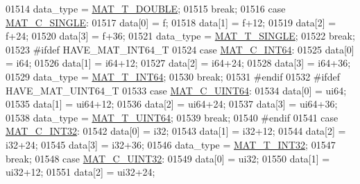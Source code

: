 \begin{DoxyCode}
{{{{{01514             data\_type = \hyperlink{group___m_a_t_ggacf7b3b879282b7ab3a51190e49bf3453a31e721ecf7e188196f83c32838288797}{MAT\_T\_DOUBLE};
01515             \textcolor{keywordflow}{break};
01516         \textcolor{keywordflow}{case} \hyperlink{group___m_a_t_ggad4d60ae7b709fc81bfd744fb4c857c40a2825631e26a961cbe0f79db50a39cea2}{MAT\_C\_SINGLE}:
01517             data[0] = f;
01518             data[1] = f+12;
01519             data[2] = f+24;
01520             data[3] = f+36;
01521             data\_type = \hyperlink{group___m_a_t_ggacf7b3b879282b7ab3a51190e49bf3453a3a3657d40e9212c923d9b9d03531b64c}{MAT\_T\_SINGLE};
01522             \textcolor{keywordflow}{break};
01523 \textcolor{preprocessor}{#ifdef HAVE\_MAT\_INT64\_T}
01524         \textcolor{keywordflow}{case} \hyperlink{group___m_a_t_ggad4d60ae7b709fc81bfd744fb4c857c40a1ea83bcde49b35477494412973f82409}{MAT\_C\_INT64}:
01525             data[0] = i64;
01526             data[1] = i64+12;
01527             data[2] = i64+24;
01528             data[3] = i64+36;
01529             data\_type = \hyperlink{group___m_a_t_ggacf7b3b879282b7ab3a51190e49bf3453a9e825b5d18b8f946eaf2b4b57e51c145}{MAT\_T\_INT64};
01530             \textcolor{keywordflow}{break};
01531 \textcolor{preprocessor}{#endif}
01532 \textcolor{preprocessor}{#ifdef HAVE\_MAT\_UINT64\_T}
01533         \textcolor{keywordflow}{case} \hyperlink{group___m_a_t_ggad4d60ae7b709fc81bfd744fb4c857c40a86470e25c3763d9a24623f04326195dd}{MAT\_C\_UINT64}:
01534             data[0] = ui64;
01535             data[1] = ui64+12;
01536             data[2] = ui64+24;
01537             data[3] = ui64+36;
01538             data\_type = \hyperlink{group___m_a_t_ggacf7b3b879282b7ab3a51190e49bf3453a45547932c46be27118abe08302d7e29f}{MAT\_T\_UINT64};
01539             \textcolor{keywordflow}{break};
01540 \textcolor{preprocessor}{#endif}
01541         \textcolor{keywordflow}{case} \hyperlink{group___m_a_t_ggad4d60ae7b709fc81bfd744fb4c857c40adb44fc39694e3152ae5e69470a2fefe8}{MAT\_C\_INT32}:
01542             data[0] = i32;
01543             data[1] = i32+12;
01544             data[2] = i32+24;
01545             data[3] = i32+36;
01546             data\_type = \hyperlink{group___m_a_t_ggacf7b3b879282b7ab3a51190e49bf3453a83e06a68320726c6572bfbb9f3addb1d}{MAT\_T\_INT32};
01547             \textcolor{keywordflow}{break};
01548         \textcolor{keywordflow}{case} \hyperlink{group___m_a_t_ggad4d60ae7b709fc81bfd744fb4c857c40a9a17a7edd45b19ef68197db81b27e816}{MAT\_C\_UINT32}:
01549             data[0] = ui32;
01550             data[1] = ui32+12;
01551             data[2] = ui32+24;
}}}}}
\end{DoxyCode}
